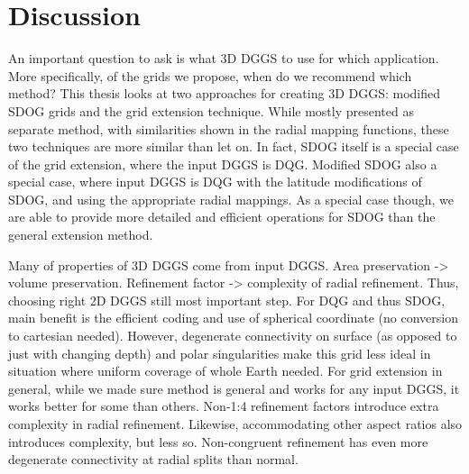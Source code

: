 \chapter{Discussion} \label{chap:discussion}
An important question to ask is what 3D DGGS to use for which application.
More specifically, of the grids we propose, when do we recommend which method?
This thesis looks at two approaches for creating 3D DGGS: modified SDOG grids and the grid extension technique.
While mostly presented as separate method, with similarities shown in the radial mapping functions, these two techniques are more similar than let on.
In fact, SDOG itself is a special case of the grid extension, where the input DGGS is DQG.
Modified SDOG also a special case, where input DGGS is DQG with the latitude modifications of SDOG, and using the appropriate radial mappings.
As a special case though, we are able to provide more detailed and efficient operations for SDOG than the general extension method.


Many of properties of 3D DGGS come from input DGGS.
Area preservation -> volume preservation. Refinement factor -> complexity of radial refinement.
Thus, choosing right 2D DGGS still most important step.
For DQG and thus SDOG, main benefit is the efficient coding and use of spherical coordinate (no conversion to cartesian needed).
However, degenerate connectivity on surface (as opposed to just with changing depth) and polar singularities make this grid less ideal in situation where uniform coverage of whole Earth needed.
For grid extension in general, while we made sure method is general and works for any input DGGS, it works better for some than others.
Non-1:4 refinement factors introduce extra complexity in radial refinement.
Likewise, accommodating other aspect ratios also introduces complexity, but less so.
Non-congruent refinement has even more degenerate connectivity at radial splits than normal.



